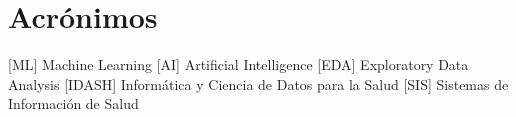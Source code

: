 \section*{Acrónimos}
\begin{acronym} 
 [ML] {Machine Learning}
 [AI] {Artificial Intelligence}
 [EDA] {Exploratory Data Analysis}
 [IDASH] {Informática y Ciencia de Datos para la Salud}
 [SIS] {Sistemas de Información de Salud}
\end{acronym}
